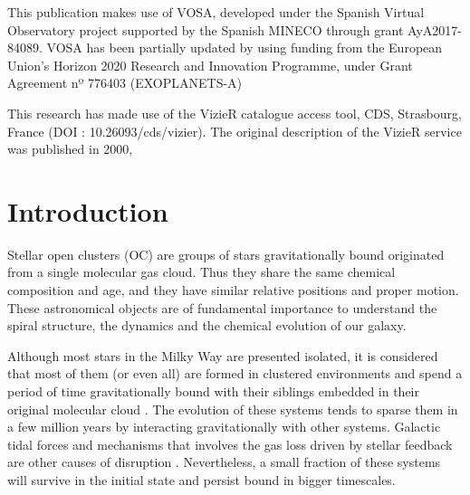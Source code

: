 \documentclass[11pt, a4paper, english]{book}
\begin{document}
\medskip

This publication makes use of VOSA, developed under the Spanish Virtual Observatory project
supported by the Spanish MINECO through grant AyA2017-84089.
VOSA has been partially updated by using funding from the European Union's Horizon 2020 Research
and Innovation Programme, under Grant Agreement nº 776403 (EXOPLANETS-A)

\medskip

This research has made use of the VizieR catalogue access tool, CDS, Strasbourg, France (DOI : 10.26093/cds/vizier).
The original description of the VizieR service was published in 2000, \cite[A\&AS 143, 23]{ochsenbein2000vizier}

\mainmatter
\chapter{Introduction}







Stellar open clusters (OC) \cite{janes1982open} are groups of stars gravitationally bound originated from a single molecular gas cloud.
Thus they share the same chemical composition and age, and they have similar relative positions and proper motion.
These astronomical objects are of fundamental importance to understand the spiral structure,
the dynamics and the chemical evolution of our galaxy.

Although most stars in the Milky Way are presented isolated, it is considered that most of them (or even all)
are formed in clustered environments and spend a period of time gravitationally bound with their siblings embedded
in their original molecular cloud
\cite{clarke2000theformationofstellarclusters} \cite{portegies2010young}.
The evolution of these systems tends to sparse them in a few million years by interacting gravitationally with other systems.
Galactic tidal forces and mechanisms that involves the gas loss driven by stellar feedback are other causes of disruption
\cite{brinkmann2017bound}.
Nevertheless, a small fraction of these systems will survive in the initial state and persist bound in bigger timescales.
\end{document}
